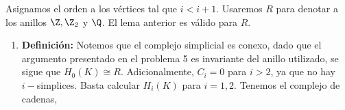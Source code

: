 \documentclass{article}
\begin{document}
\newpage
\vspace{2mm}
\noindent Asignamos el orden a los vértices tal que $i<i+1$. Usaremos $R$ para denotar a los 
anillos $\Z,\Z_{2}$ y $\Q$. El lema anterior es válido para $R$.
\begin{enumerate}
    \item\textbf{Definición:} Notemos que el complejo simplicial es conexo, dado que el argumento 
    presentado en el problema 5 es invariante del anillo utilizado, se sigue que 
    $H_{0}(K)\cong R$. Adicionalmente, $C_{i}=0$ para $i>2$, ya que no hay $i-$simplices. Basta 
    calcular $H_{i}(K)$ para $i=1,2$. Tenemos el complejo de cadenas,

    \vspace{2mm}
    \centerline{
    }


\end{enumerate}
\end{document}
